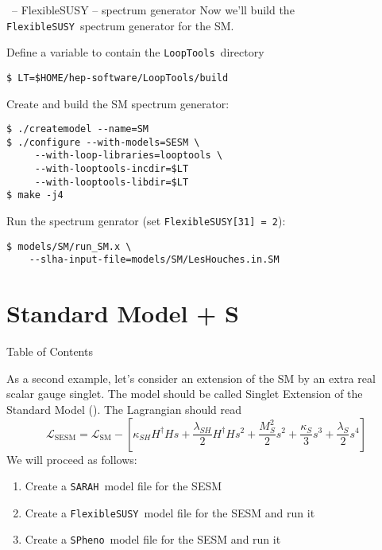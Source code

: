 \documentclass[11pt]{beamer}
\newcommand{\FlexibleSUSY}{\texttt{FlexibleSUSY}}
\newcommand{\Lagr}{\mathcal{L}}
\newcommand{\LoopTools}{\texttt{LoopTools}}
\newcommand{\SARAH}{\texttt{SARAH}}
\newcommand{\SESM}{\text{SESM}}
\newcommand{\SM}{\text{SM}}
\newcommand{\SPheno}{\texttt{SPheno}}
\begin{document}

\begin{frame}[fragile]{\insertsection\ -- FlexibleSUSY -- spectrum generator}
  Now we'll build the \FlexibleSUSY\ spectrum generator for the SM.

  \bigskip

  Define a variable to contain the \LoopTools\ directory
  \begin{lstlisting}
$ LT=$HOME/hep-software/LoopTools/build\end{lstlisting}%
  Create and build the SM spectrum generator:
  \begin{lstlisting}
$ ./createmodel --name=SM
$ ./configure --with-models=SESM \
     --with-loop-libraries=looptools \
     --with-looptools-incdir=$LT
     --with-looptools-libdir=$LT
$ make -j4\end{lstlisting}%
  Run the spectrum genrator (set \texttt{FlexibleSUSY[31] = 2}):
  \begin{lstlisting}
$ models/SM/run_SM.x \
    --slha-input-file=models/SM/LesHouches.in.SM\end{lstlisting}%
\end{frame}


\section{Standard Model + S}


\begin{frame}{Table of Contents}
  \tableofcontents[currentsection]
\end{frame}


\begin{frame}{\insertsection}
  As a second example, let's consider an extension of the SM by an
  extra real scalar gauge singlet. The model should be called Singlet
  Extension of the Standard Model (\SESM).  The Lagrangian should read
  \begin{equation*}
    \Lagr_{\SESM} = \Lagr_{\SM} - \left[\kappa_{SH} H^\dagger H s + \frac{\lambda_{SH}}{2} H^\dagger H s^2 + \frac{M_S^2}{2} s^2 + \frac{\kappa_S}{3} s^3 + \frac{\lambda_S}{2} s^4\right]
  \end{equation*}
  We will proceed as follows:
  \begin{enumerate}
  \item Create a \SARAH\ model file for the SESM
  \item Create a \FlexibleSUSY\ model file for the SESM and run it
  \item Create a \SPheno\ model file for the SESM and run it
  \end{enumerate}
\end{frame}
\end{document}
